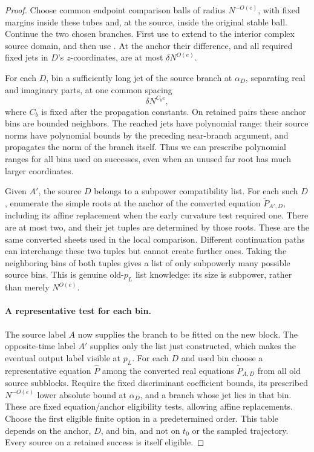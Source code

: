 \begin{proof}
Choose common endpoint comparison balls of radius
\(N^{-O(e)}\), with fixed margins inside these tubes and,
at the source, inside the original stable ball.
Continue the two chosen branches.  First use
 to extend
 to the interior complex source
domain, and then use .
At the anchor their difference, and all required fixed
jets in \(D\)'s \(z\)-coordinates, are at most
\(\delta N^{O(e)}\).

For each \(D\), bin a sufficiently long jet of the source
branch at \(\alpha_D\), separating real and imaginary
parts, at one common spacing
\begin{equation}
 \delta N^{C_b e},
 \label{a02:anchor-spacing}
\end{equation}
where \(C_b\) is fixed after the propagation constants.
On retained pairs these anchor bins are bounded neighbors.
The reached jets have polynomial range: their source
norms have polynomial bounds by the preceding near-branch
argument, and  propagates the norm
of the branch itself.  Thus we can prescribe polynomial
ranges for all bins used on successes, even when an
unused far root has much larger coordinates.

Given \(A'\), the source \(D\) belongs to a subpower
compatibility list.  For each such \(D\), enumerate the simple
roots at the anchor of the converted equation
\(\widetilde P_{A',D}\), including its affine replacement when
the early curvature test required one.  There are at most two,
and their jet tuples are determined by those roots.  These are
the same converted sheets used in the local comparison.
Different continuation paths can interchange these two tuples but
cannot create further ones.  Taking the neighboring bins
of both tuples gives a list of only subpowerly many
possible source bins.  This is genuine old-\(p_L\) list
knowledge: its size is subpower, rather than merely
\(N^{O(e)}\).

\paragraph{A representative test for each bin.}
The source label \(A\) now supplies the branch to be fitted on
the new block.  The opposite-time label \(A'\) supplies only the
list just constructed, which makes the eventual output label
visible at \(p_L\).
For each \(D\) and used bin choose a representative
equation \(\widehat P\) among the converted real equations
\(\widetilde P_{A,D}\) from all old source subblocks.  Require the fixed
discriminant coefficient bounds, its prescribed
\(N^{-O(e)}\) lower absolute bound at \(\alpha_D\), and
a branch whose jet lies in that bin.  These are fixed
equation/anchor eligibility tests, allowing affine
replacements.  Choose the first eligible finite option
in a predetermined order.  This table depends on the
anchor, \(D\), and bin, and not on \(t_0\) or the sampled
trajectory.  Every source on a retained success is itself
eligible.


\end{proof}
